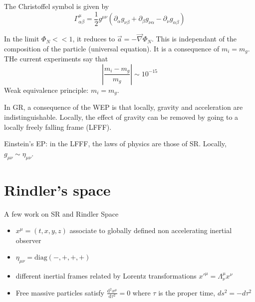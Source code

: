 \documentclass[a4paper]{book}
\theoremstyle{definition}
\theoremstyle{remark}
\begin{document}
The Christoffel symbol is given by 
\begin{equation}
    \Gamma^\mu_{\alpha\beta} = \frac{1}{2}g^{\mu\nu} (\partial_\alpha g_{\nu\beta} + \partial_\beta g_{\nu\alpha} - \partial_\nu g_{\alpha\beta})
\end{equation}\par \medskip 

In the limit $\Phi_N << 1$, it reduces to $\vec{a} = - \vec{\nabla} \Phi_N$. This is independant of the composition of the particle (universal equation). It is a consequence of $m_i = m_g$. THe current experiments say that 
\begin{equation*}
    \left|\frac{m_i - m_g}{m_g}\right| \sim 10^{-15}
\end{equation*}
Weak equivalence principle: $m_i = m_g$. \par \medskip 

In GR, a consequence of the WEP is that locally, gravity and acceleration are indistinguishable. Locally, the effect of gravity can be removed by going to a locally freely falling frame (LFFF).\par 
Einstein's EP: in the LFFF, the laws of physics are those of SR. Locally, $g_{\mu\nu} \sim \eta_{\mu\nu}$. 

\section{Rindler's space}

A few work on SR and Rindler Space
\begin{itemize}
    \item $x^\mu = (t, x, y, z)$ associate to globally defined non accelerating inertial observer 
    \item $\eta_{\mu\nu} = \text{diag}(-, +, +, +)$
    \item different inertial frames related by Lorentz transformations $x'^\mu = \Lambda ^\mu_\nu x^\nu$
    \item Free massive particles satisfy $\frac{\text{d}^2x^\mu}{\text{d}\tau^2} = 0$ where $\tau$ is the proper time, $ds^2 = -d\tau^2$
\end{itemize}
\end{document}
